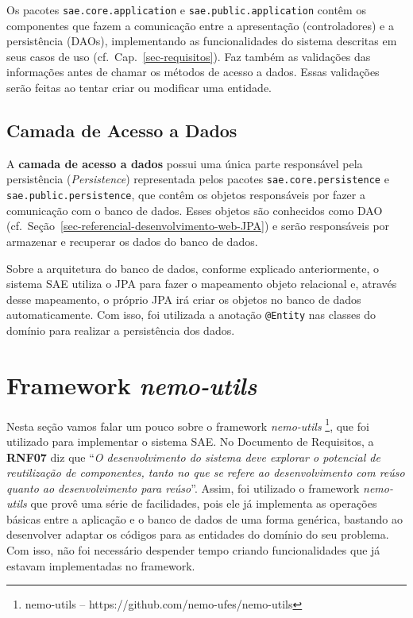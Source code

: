 Os pacotes \texttt{sae.core.application} e \texttt{sae.public.application} contêm os componentes que fazem a comunicação entre a apresentação (controladores) e a persistência (DAOs), implementando as funcionalidades do sistema descritas em seus casos de uso (cf.\ Cap.~\ref{sec-requisitos}). Faz também as validações das informações antes de chamar os métodos de acesso a dados. Essas validações serão feitas ao tentar criar ou modificar uma entidade.





\subsection{Camada de Acesso a Dados}
\label{sec-projeto-arquitetura-sistema-camada-acesso-dados}

A \textbf{camada de acesso a dados} possui uma única parte responsável pela persistência (\textit{Persistence}) representada pelos pacotes \texttt{sae.core.persistence} e \texttt{sae.public.per\-sistence}, que contêm os objetos responsáveis por fazer a comunicação com o banco de dados. Esses objetos são conhecidos como DAO (cf.\ Seção~\ref{sec-referencial-desenvolvimento-web-JPA}) e serão responsáveis por armazenar e recuperar os dados do banco de dados.

Sobre a arquitetura do banco de dados, conforme explicado anteriormente, o sistema SAE utiliza o JPA para fazer o mapeamento objeto relacional e, através desse mapeamento, o próprio JPA irá criar os objetos no banco de dados automaticamente. Com isso, foi utilizada a anotação \texttt{@Entity} nas classes do domínio para realizar a persistência dos dados.









\section{Framework \textit{nemo-utils}}
\label{sec-projeto-framework-nemo-utils}

Nesta seção vamos falar um pouco sobre o framework \textit{nemo-utils} \footnote{nemo-utils -- https://github.com/nemo-ufes/nemo-utils}, que foi utilizado para implementar o sistema SAE. No Documento de Requisitos, a \textbf{RNF07} diz que ``\textit{O desenvolvimento do sistema deve explorar o potencial de reutilização de componentes, tanto no que se refere ao desenvolvimento com reúso quanto ao desenvolvimento para reúso}''. Assim, foi utilizado o framework \textit{nemo-utils} que provê uma série de facilidades, pois ele já implementa as operações básicas entre a aplicação e o banco de dados de uma forma genérica, bastando ao desenvolver adaptar os códigos para as entidades do domínio do seu problema. Com isso, não foi necessário despender tempo criando funcionalidades que já estavam implementadas no framework. 

